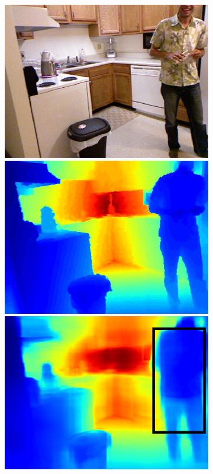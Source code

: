 \begin{figure}[htb]
\begin{subfigure}{0.15\linewidth}
  \begin{minipage}[t]{1\linewidth}
  \centering
  \includegraphics[width=1\linewidth]{figure/nyu_rgb/566.png}
  \includegraphics[width=1\linewidth]{figure/nyu_gt/566.png}
  \includegraphics[width=1\linewidth]{figure/nyu_result/kitchen_rgb_00566.png}

\end{minipage}
\end{subfigure}
\end{figure}
